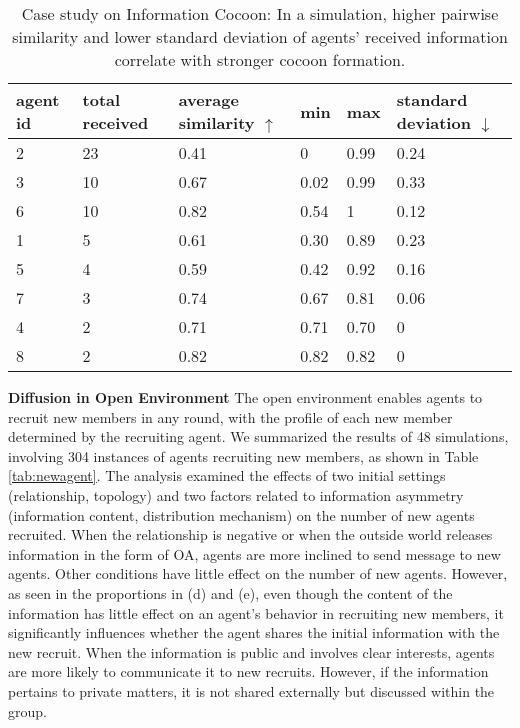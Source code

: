 \begin{table}[!ht]
    \centering
    \footnotesize
    
    \begin{tabular}{p{0.6cm}p{1cm}p{1.3cm}p{0.5cm}p{0.5cm}p{1cm}}
         \toprule
         agent id&total received&average similarity $\uparrow$ &min&max& standard deviation $\downarrow$ \\
         \midrule
         2&  23&  0.41&  0&  0.99& 0.24\\
         \midrule
         3&  10&  0.67&  0.02&  0.99& 0.33\\
         \midrule
         \textcolor{bluee}{6}&  10&  \textcolor{bluee}{0.82}&  0.54&  1& \textcolor{bluee}{0.12}\\
         \midrule
         1&  5&  0.61&  0.30&  0.89& 0.23\\
         \midrule
         5&  4&  0.59&  0.42&  0.92& 0.16\\
         \midrule
         7&  3&  0.74&  0.67&  0.81& 0.06\\
         \midrule
         4&  2&  0.71&  0.71&  0.70& 0\\
         \midrule
         8&  2&  0.82&  0.82&  0.82& 0\\
         \bottomrule
    \end{tabular}
    
    \caption{Case study on Information Cocoon: In a simulation, higher pairwise similarity and lower standard deviation of agents' received information correlate with stronger cocoon formation.}
    \label{tab:cocoon}
\end{table}


\noindent \textbf{Diffusion in Open Environment} \quad The open environment enables agents to recruit new members in any round, with the profile of each new member determined by the recruiting agent. We summarized the results of 48 simulations, involving 304 instances of agents recruiting new members, as shown in Table \ref{tab:newagent}. The analysis examined the effects of two initial settings (relationship, topology) and two factors related to information asymmetry (information content, distribution mechanism) on the number of new agents recruited.
When the relationship is negative or when the outside world releases information in the form of OA, agents are more inclined to send message to new agents. Other conditions have little effect on the number of new agents. However, as seen in the proportions in (d) and (e), even though the content of the information has little effect on an agent's behavior in recruiting new members, it significantly influences whether the agent shares the initial information with the new recruit.
When the information is public and involves clear interests, agents are more likely to communicate it to new recruits. However, if the information pertains to private matters, it is not shared externally but discussed within the group.


